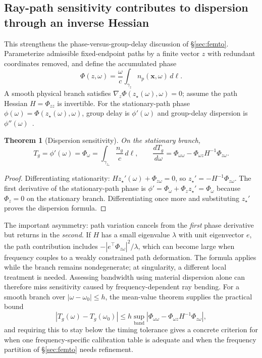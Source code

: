 \documentclass[11pt]{article}
\newtheorem{theorem}{Theorem}
\newcommand{\xv}{\mathbf{x}}
\begin{document}
\subsection{Ray-path sensitivity contributes to dispersion through an inverse Hessian}

This strengthens the phase-versus-group-delay discussion of \S\ref{sec:femto}.
Parameterize admissible fixed-endpoint paths by a finite vector $z$ with redundant
coordinates removed, and define the accumulated phase
\begin{equation}
\Phi(z,\omega) = \frac{\omega}{c}\int_{\gamma_z} n_p(\xv,\omega)\,d\ell.
\end{equation}
A smooth physical branch satisfies $\nabla_z \Phi(z_\star(\omega),\omega) = 0$; assume
the path Hessian $H = \Phi_{zz}$ is invertible. For the stationary-path phase
$\phi(\omega) = \Phi(z_\star(\omega),\omega)$, group delay is $\phi'(\omega)$ and
group-delay dispersion is $\phi''(\omega)$~\cite{bonnans2000}.

\begin{theorem}[Dispersion sensitivity]\label{thm:dispersion}
On the stationary branch,
\begin{equation}
\boxed{
T_g = \phi'(\omega) = \Phi_\omega = \int_{\gamma_{z_\star}} \frac{n_g}{c}\,d\ell,
\qquad
\frac{dT_g}{d\omega} = \Phi_{\omega\omega} - \Phi_{\omega z} H^{-1} \Phi_{z\omega}.
}
\end{equation}
\end{theorem}
\begin{proof}
Differentiating stationarity: $H z_\star'(\omega) + \Phi_{z\omega} = 0$, so
$z_\star' = -H^{-1}\Phi_{z\omega}$. The first derivative of the stationary-path phase is
$\phi' = \Phi_\omega + \Phi_z z_\star' = \Phi_\omega$ because $\Phi_z = 0$ on the
stationary branch. Differentiating once more and substituting $z_\star'$ proves the
dispersion formula.
\end{proof}

The important asymmetry: path variation cancels from the \emph{first} phase derivative
but returns in the \emph{second}. If $H$ has a small eigenvalue $\lambda$ with unit
eigenvector $e$, the path contribution includes $-|e^\top \Phi_{z\omega}|^2/\lambda$,
which can become large when frequency couples to a weakly constrained path deformation.
The formula applies while the branch remains nondegenerate; at singularity, a different
local treatment is needed. Assessing bandwidth using material dispersion alone can
therefore miss sensitivity caused by frequency-dependent ray bending. For a smooth
branch over $|\omega - \omega_0| \le h$, the mean-value theorem supplies the practical
bound
\begin{equation}
\boxed{
\left|T_g(\omega) - T_g(\omega_0)\right| \le
h \sup_{\text{band}} \left|\Phi_{\omega\omega} - \Phi_{\omega z} H^{-1} \Phi_{z\omega}\right|,
}
\end{equation}
and requiring this to stay below the timing tolerance gives a concrete criterion for
when one frequency-specific calibration table is adequate and when the frequency
partition of \S\ref{sec:femto} needs refinement.
\end{document}
